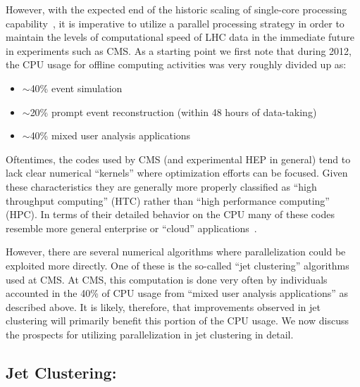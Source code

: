 \documentclass[12pt]{article}
\begin{document}
However, with the expected end of the historic scaling of single-core
processing capability~\cite{GAMEOVER}, it is imperative to utilize a
parallel processing
strategy in order to maintain the levels of computational speed of LHC
data in the immediate future in experiments such as CMS.
As a starting point we first note that during 
2012, the CPU usage for offline computing activities was very 
roughly divided up as:

\begin{itemize}
\item $\sim$40\% event simulation
\item $\sim$20\% prompt event reconstruction (within 48 hours of data-taking)
\item $\sim$40\% mixed user analysis applications
\end{itemize}

Oftentimes,
the codes used by CMS (and experimental HEP in general) tend to lack
clear numerical ``kernels'' where optimization efforts can be focused. 
Given these characteristics they are generally more properly classified as
``high throughput computing'' (HTC) rather than ``high performance computing'' (HPC). 
In terms of their detailed behavior on the CPU many of these codes resemble
more general enterprise or ``cloud''
applications~\cite{CLOUDSUITE,GOODACHEP}.

However, there are several numerical algorithms where parallelization
could be exploited more directly. One of these is the so-called ``jet
clustering'' algorithms used at CMS. 
At CMS, this computation is done very often by individuals accounted
in the 40\% of CPU usage from ``mixed user analysis applications'' as
described above. It is likely, therefore, that improvements observed
in jet clustering will primarily benefit this portion of the CPU
usage. We now discuss the prospects for
utilizing parallelization in jet clustering in detail. 

 

\subsection{Jet Clustering:} 
\end{document}
